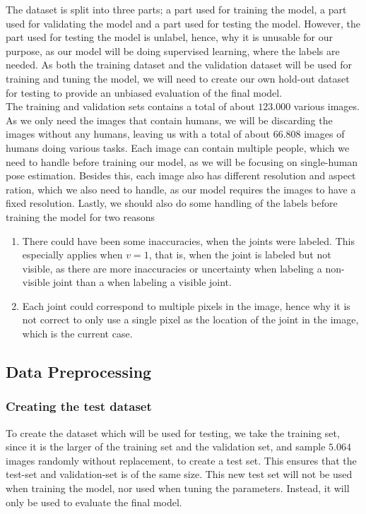 \documentclass[main.tex]{subfiles}
\begin{document}
The dataset is split into three parts; a part used for training the model, a part used for validating the model and a part used for testing the model. However, the part used for testing the model is unlabel, hence, why it is unusable for our purpose, as our model will be doing supervised learning, where the labels are needed. As both the training dataset and the validation dataset will be used for training and tuning the model, we will need to create our own hold-out dataset for testing to provide an unbiased evaluation of the final model. \\
The training and validation sets contains a total of about $123.000$ various images. As we only need the images that contain humans, we will be discarding the images without any humans, leaving us with a total of about $66.808$ images of humans doing various tasks. Each image can contain multiple people, which we need to handle before training our model, as we will be focusing on single-human pose estimation. Besides this, each image also has different resolution and aspect ration, which we also need to handle, as our model requires the images to have a fixed resolution. Lastly, we should also do some handling of the labels before training the model for two reasons
\begin{enumerate}
    \item There could have been some inaccuracies, when the joints were labeled. This especially applies when $v = 1$, that is, when the joint is labeled but not visible, as there are more inaccuracies or uncertainty when labeling a non-visible joint than a when labeling a visible joint.
    \item Each joint could correspond to multiple pixels in the image, hence why it is not correct to only use a single pixel as the location of the joint in the image, which is the current case.
\end{enumerate}

\subsection{Data Preprocessing}
\subsubsection{Creating the test dataset}
To create the dataset which will be used for testing, we take the training set, since it is the larger of the training set and the validation set, and sample $5.064$ images randomly without replacement, to create a test set. This ensures that the test-set and validation-set is of the same size. This new test set will not be used when training the model, nor used when tuning the parameters. Instead, it will only be used to evaluate the final model. 
\end{document}

